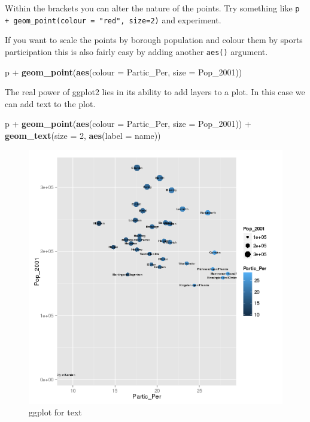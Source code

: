 \documentclass[]{article}
\newenvironment{Shaded}{}{}
\newcommand{\KeywordTok}[1]{\textcolor[rgb]{0.00,0.44,0.13}{\textbf{{#1}}}}
\newcommand{\DataTypeTok}[1]{\textcolor[rgb]{0.56,0.13,0.00}{{#1}}}
\newcommand{\DecValTok}[1]{\textcolor[rgb]{0.25,0.63,0.44}{{#1}}}
\newcommand{\StringTok}[1]{\textcolor[rgb]{0.25,0.44,0.63}{{#1}}}
\newcommand{\NormalTok}[1]{{#1}}
\begin{document}
Within the brackets you can alter the nature of the points. Try
something like \texttt{p + geom\_point(colour = "red", size=2)} and
experiment.

If you want to scale the points by borough population and colour them by
sports participation this is also fairly easy by adding another
\texttt{aes()} argument.

\begin{Shaded}
\begin{Highlighting}[]
\NormalTok{p +}\StringTok{ }\KeywordTok{geom_point}\NormalTok{(}\KeywordTok{aes}\NormalTok{(}\DataTypeTok{colour =} \NormalTok{Partic_Per, }\DataTypeTok{size =} \NormalTok{Pop_2001))}
\end{Highlighting}
\end{Shaded}

The real power of ggplot2 lies in its ability to add layers to a plot.
In this case we can add text to the plot.

\begin{Shaded}
\begin{Highlighting}[]
\NormalTok{p +}\StringTok{ }\KeywordTok{geom_point}\NormalTok{(}\KeywordTok{aes}\NormalTok{(}\DataTypeTok{colour =} \NormalTok{Partic_Per, }\DataTypeTok{size =} \NormalTok{Pop_2001)) +}\StringTok{ }\KeywordTok{geom_text}\NormalTok{(}\DataTypeTok{size =} \DecValTok{2}\NormalTok{, }
    \KeywordTok{aes}\NormalTok{(}\DataTypeTok{label =} \NormalTok{name))}
\end{Highlighting}
\end{Shaded}

\begin{figure}[htbp]
\centering
\includegraphics{figure/ggplot_for_text.png}
\caption{ggplot for text}
\end{figure}
\end{document}
